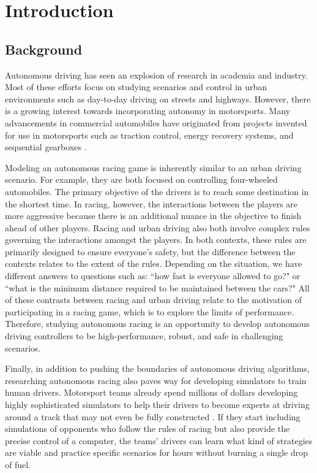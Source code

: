\chapter{Introduction} \label{chapter:intro}
\section{Background} 
Autonomous driving has seen an explosion of research in academia and industry. Most of these efforts focus on studying scenarios and control in urban environments such as day-to-day driving on streets and highways. However, there is a growing interest towards incorporating autonomy in motorsports. Many advancements in commercial automobiles have originated from projects invented for use in motorsports such as traction control, energy recovery systems, and sequential gearboxes \cite{racingadvances}. 

Modeling an autonomous racing game is inherently similar to an urban driving scenario. For example, they are both focused on controlling four-wheeled automobiles. The primary objective of the drivers is to reach some destination in the shortest time. In racing, however, the interactions between the players are more aggressive because there is an additional nuance in the objective to finish ahead of other players. Racing and urban driving also both involve complex rules governing the interactions amongst the players. In both contexts, these rules are primarily designed to ensure everyone's safety, but the difference between the contexts relates to the extent of the rules. Depending on the situation, we have different answers to questions such as: ``how fast is everyone allowed to go?" or ``what is the minimum distance required to be maintained between the cars?" All of these contrasts between racing and urban driving relate to the motivation of participating in a racing game, which is to explore the limits of performance. Therefore, studying autonomous racing is an opportunity to develop autonomous driving controllers to be high-performance, robust, and safe in challenging scenarios. 

Finally, in addition to pushing the boundaries of autonomous driving algorithms, researching autonomous racing also paves way for developing simulators to train human drivers. Motorsport teams already spend millions of dollars developing highly sophisticated simulators to help their drivers to become experts at driving around a track that may not even be fully constructed \cite{simulators}. If they start including simulations of opponents who follow the rules of racing but also provide the precise control of a computer, the teams' drivers can learn what kind of strategies are viable and practice specific scenarios for hours without burning a single drop of fuel.

